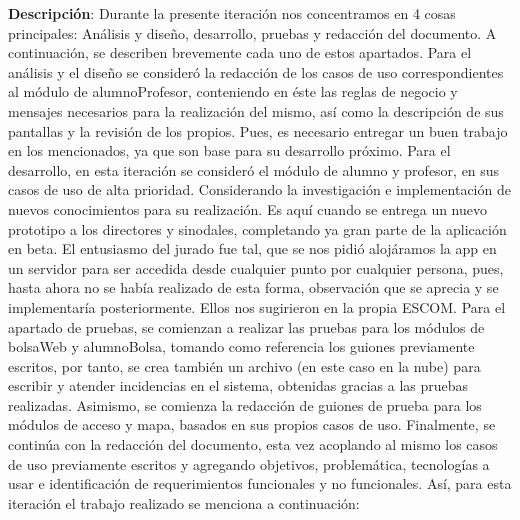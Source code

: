 \noindent
\textbf{Descripción}: Durante la presente iteración nos concentramos en 4 cosas principales: Análisis y diseño, desarrollo, pruebas y redacción del documento. A continuación, se describen brevemente cada uno de estos apartados.
\newline
\newline
Para el análisis y el diseño se consideró la redacción de los casos de uso correspondientes al módulo de alumnoProfesor, conteniendo en éste las reglas de negocio y mensajes necesarios para la realización del mismo, así como la descripción de sus pantallas y la revisión de los propios. Pues, es necesario entregar un buen trabajo en los mencionados, ya que son base para su desarrollo próximo.
\newline
\newline
Para el desarrollo, en esta iteración se consideró el módulo de alumno y profesor, en sus casos de uso de alta prioridad. Considerando la investigación e implementación de nuevos conocimientos para su realización. Es aquí cuando se entrega un nuevo prototipo a los directores y sinodales, completando ya gran parte de la aplicación en beta. El entusiasmo del jurado fue tal, que se nos pidió alojáramos la app en un servidor para ser accedida desde cualquier punto por cualquier persona, pues, hasta ahora no se había realizado de esta forma, observación que se aprecia y se implementaría posteriormente. Ellos nos sugirieron en la propia ESCOM.
\newline
\newline
Para el apartado de pruebas, se comienzan a realizar las pruebas para los módulos de bolsaWeb y alumnoBolsa, tomando como referencia los guiones previamente escritos, por tanto, se crea también un archivo (en este caso en la nube) para escribir y atender incidencias en el sistema, obtenidas gracias a las pruebas realizadas. 
\newline
Asimismo, se comienza la redacción de guiones de prueba para los módulos de acceso y mapa, basados en sus propios casos de uso. 
\newline
\newline
Finalmente, se continúa con la redacción del documento, esta vez acoplando al mismo los casos de uso previamente escritos y agregando objetivos, problemática, tecnologías a usar e identificación de requerimientos funcionales y no funcionales.
\newline
Así, para esta iteración el trabajo realizado se menciona a continuación:
